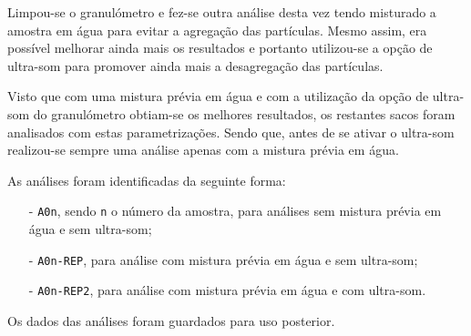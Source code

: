 Limpou-se o granulómetro e fez-se outra análise desta vez tendo misturado a amostra em água para evitar a agregação das partículas.
Mesmo assim, era possível melhorar ainda mais os resultados e portanto utilizou-se a opção de ultra-som para promover ainda mais a desagregação das partículas.

Visto que com uma mistura prévia em água e com a utilização da opção de ultra-som do granulómetro obtiam-se os melhores resultados, os restantes sacos foram analisados com estas parametrizações.
Sendo que, antes de se ativar o ultra-som realizou-se sempre uma análise apenas com a mistura prévia em água.

As análises foram identificadas da seguinte forma:
\begin{itemize}
    \item[-] \texttt{A0n}, sendo \texttt{n} o número da amostra, para análises sem mistura prévia em água e sem ultra-som;
    \item[-] \texttt{A0n-REP}, para análise com mistura prévia em água e sem ultra-som;
    \item[-] \texttt{A0n-REP2}, para análise com mistura prévia em água e com ultra-som.
\end{itemize}


Os dados das análises foram guardados para uso posterior.

\hrulefill
\pagebreak


\label{day:31-outubro-2024}

